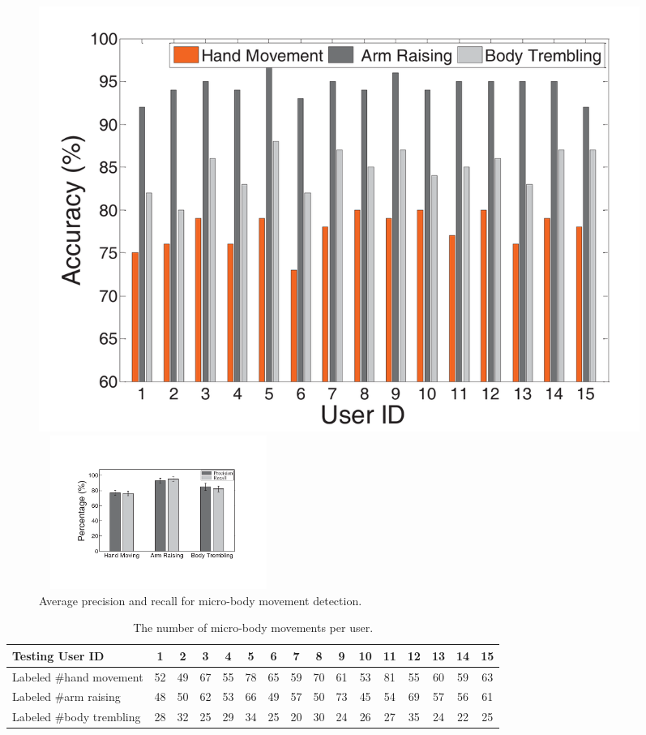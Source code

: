 \begin{figure}
	\centering
	\begin{minipage}{.485\textwidth}
		 \includegraphics[width=0.95\textwidth]{Figures/micro_movement_zhu.pdf}
		\caption{Micro-body movement detection for each user.}\label{fig:micro_movement_zhu}	
	\end{minipage}%
\hspace{3pt}
	\begin{minipage}{.485\textwidth}
	 \centering
	\includegraphics[width=7.8cm,height=5cm]{Figures/micro_combine1.pdf}
	\caption{Average precision and recall for micro-body movement detection.}\label{fig:micro_combine}
	\end{minipage}
\end{figure}


\begin{table}[!t]\footnotesize
  \caption{The number of micro-body movements per user.}\label{tab:micro_move}
   \renewcommand\arraystretch{1}{\multirowsetup}{\centering}
        \begin{tabular}{lccccccccccccccc}
        \toprule
         \textbf{Testing User ID}    & 1& 2  & 3& 4& 5& 6& 7& 8& 9& 10& 11& 12& 13& 14& 15\\
        \midrule
            \rowcolor{Gray} {Labeled \#hand movement}  &52&49&67&55&78&65&59&70&61&53&81&55&60&59&63 \\
             { Labeled \#arm raising} &48&50&62&53&66&49&57&50&73&45&54&69&57&56&61\\
             \rowcolor{Gray} { Labeled \#body trembling} &28&32&25&29&34&25&20&30&24&26&27&35&24&22&25\\
        \bottomrule
 \end{tabular}
\end{table}


